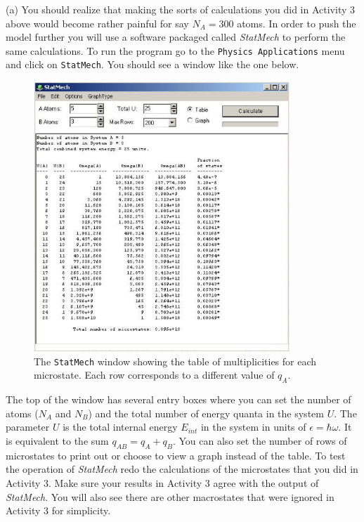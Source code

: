 (a) You should realize that making the sorts of calculations you did in Activity 3 above would
become rather painful for say $N_A = 300$ atoms.
In order to push the model further you will use a software packaged called 
{\it StatMech} to perform the same calculations.
To run the program go to the {\tt Physics Applications} menu and click on
{\tt StatMech}.
You should see a window like the one below.
\begin{figure}[!ht]
\begin{center}
\includegraphics[height=4.0in]{einstein_solid/statmech1.eps}
\caption{The {\tt StatMech} window showing the table of multiplicities for each microstate.
Each row corresponds to a different value of $q_A$.}
\end{center}
\end{figure}
The top of the window has several entry boxes where you can set the number of
atoms ($N_A$ and $N_B$) and the total number of energy quanta in the system $U$.
The parameter $U$ is the total internal energy $E_{int}$ in the system in 
units of $\epsilon = \hbar \omega$.
It is equivalent to the sum $q_{AB} = q_A + q_B$.
You can also set the number of rows of microstates to print out
or choose to view a graph instead of the table.
To test the operation of {\it StatMech} redo the calculations of the microstates that
you did in Activity 3. Make sure your results in Activity 3 agree with the output of 
{\it StatMech}.
You will also see there are other macrostates that were ignored in Activity 3 for
simplicity.

